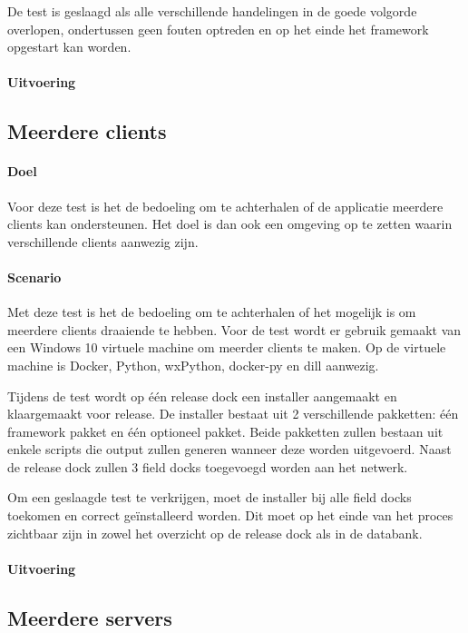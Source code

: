De test is geslaagd als alle verschillende handelingen in de goede volgorde overlopen, ondertussen geen fouten optreden en op het einde het framework opgestart kan worden.

\paragraph{Uitvoering}


\subsection{Meerdere clients}
\paragraph{Doel}
Voor deze test is het de bedoeling om te achterhalen of de applicatie meerdere clients kan ondersteunen.
Het doel is dan ook een omgeving op te zetten waarin verschillende clients aanwezig zijn.

\paragraph{Scenario}
Met deze test is het de bedoeling om te achterhalen of het mogelijk is om meerdere clients draaiende te hebben.
Voor de test wordt er gebruik gemaakt van een Windows 10 virtuele machine om meerder clients te maken.
Op de virtuele machine is Docker, Python, wxPython, docker-py en dill aanwezig.

Tijdens de test wordt op één release dock een installer aangemaakt en klaargemaakt voor release.
De installer bestaat uit 2 verschillende pakketten: één framework pakket en één optioneel pakket.
Beide pakketten zullen bestaan uit enkele scripts die output zullen generen wanneer deze worden uitgevoerd.
Naast de release dock zullen 3 field docks toegevoegd worden aan het netwerk.

Om een geslaagde test te verkrijgen, moet de installer bij alle field docks toekomen en correct geïnstalleerd worden.
Dit moet op het einde van het proces zichtbaar zijn in zowel het overzicht op de release dock als in de databank.

\paragraph{Uitvoering}


\subsection{Meerdere servers}
